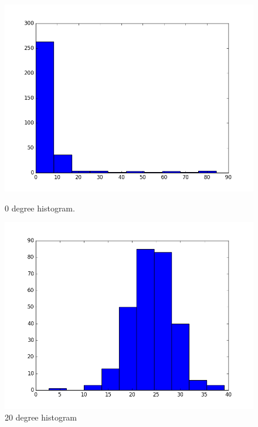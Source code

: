 \documentclass[12pt]{article}
\numberwithin{figure}{section}
\numberwithin{table}{section}
\begin{document}
\begin{figure}[H]
  \centering
  \begin{minipage}[b]{0.4\textwidth}
    \includegraphics[width=\textwidth]{figure_1.png}
    \caption{0 degree histogram.}
  \end{minipage}
  \hfill
  \begin{minipage}[b]{0.4\textwidth}
    \includegraphics[width=\textwidth]{figure_20.png}
    \caption{20 degree histogram}
  \end{minipage}
\end{figure}
\end{document}
